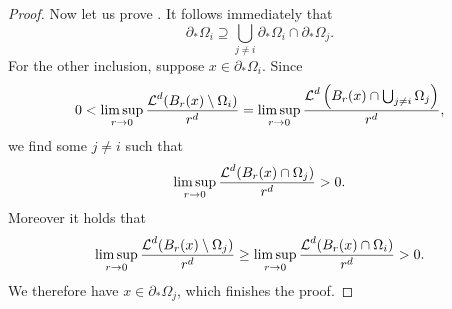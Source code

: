 \begin{proof}
	Now let us prove . It follows immediately that  
	\begin{equation*}
		\partial_{ \ast } \Omega_{ i }
		\supseteq
		\bigcup_{ j \neq i }
		\partial_{ \ast } \Omega_{ i }
		\cap
		\partial_{ \ast } \Omega_{ j }.
	\end{equation*}
	For the other inclusion, suppose $ x \in \partial_{ \ast } \Omega_{ i } $. Since
	\begin{equation*}
		0 <
		\limsup_{ r \to 0 }
		\frac{ \operatorname{\mathcal{L}}^{ d } ( B_{ r } ( x ) \setminus \Omega_{ i }) }{r^{ d } }
		=
		\limsup_{ r \to 0 } \frac{ \operatorname{\mathcal{L}}^{ d } \left( B_{ r } ( x ) \cap \bigcup_{ j \neq i } \Omega_{ j } \right) }{ r^{ d } },
	\end{equation*}
	we find some $ j \neq i $ such that
	\begin{equation*}
		\limsup_{ r \to 0 } \frac{ \operatorname{\mathcal{L}}^{ d } ( B_{ r } ( x ) \cap \Omega_{ j } ) }{ r^{ d } } > 0.
	\end{equation*}
	Moreover it holds that
	\begin{equation*}
		\limsup_{ r \to 0 } \frac{ \operatorname{\mathcal{L}}^{ d } ( B_{ r } ( x ) \setminus \Omega_{ j } ) }{ r^{ d } } 
		\geq
		\limsup_{ r \to 0 } \frac{ \operatorname{\mathcal{L}}^{ d } ( B_{ r } ( x ) \cap \Omega_{ i } 
		) }{ r^{ d } } > 0.
	\end{equation*}
	We therefore have $ x \in \partial_{ \ast } \Omega_{ j } $, which finishes 
	the proof.
\end{proof}

